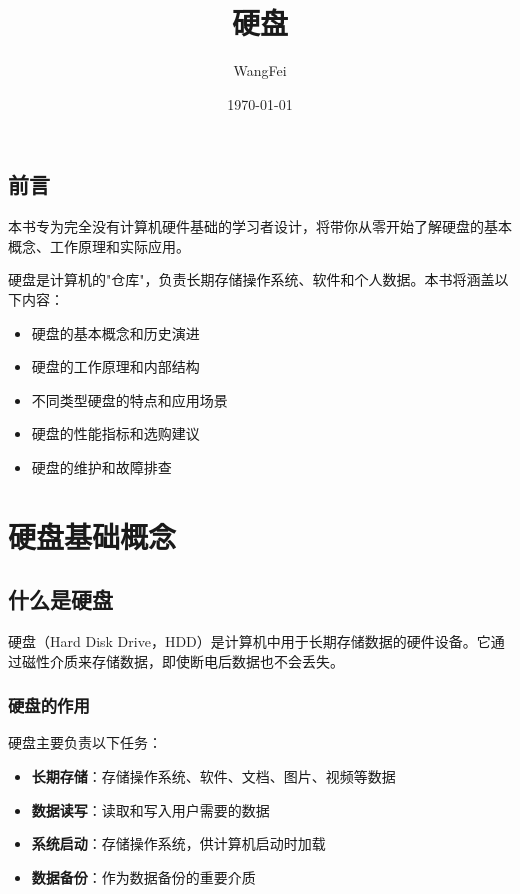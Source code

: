 \documentclass[12pt,UTF8]{ctexbook}
\title{\heiti\zihao{0} 硬盘}
\author{WangFei}
\date{\today}
\begin{document}
\maketitle
\tableofcontents

\frontmatter
\chapter{前言}

本书专为完全没有计算机硬件基础的学习者设计，将带你从零开始了解硬盘的基本概念、工作原理和实际应用。

硬盘是计算机的"仓库"，负责长期存储操作系统、软件和个人数据。本书将涵盖以下内容：
\begin{itemize}
    \item 硬盘的基本概念和历史演进
    \item 硬盘的工作原理和内部结构
    \item 不同类型硬盘的特点和应用场景
    \item 硬盘的性能指标和选购建议
    \item 硬盘的维护和故障排查
\end{itemize}

\mainmatter

\part{硬盘基础概念}

\chapter{什么是硬盘}

硬盘（Hard Disk Drive，HDD）是计算机中用于长期存储数据的硬件设备。它通过磁性介质来存储数据，即使断电后数据也不会丢失。

\section{硬盘的作用}

硬盘主要负责以下任务：

\begin{itemize}[leftmargin=2em]
    \item \textbf{长期存储}：存储操作系统、软件、文档、图片、视频等数据
    \item \textbf{数据读写}：读取和写入用户需要的数据
    \item \textbf{系统启动}：存储操作系统，供计算机启动时加载
    \item \textbf{数据备份}：作为数据备份的重要介质
\end{itemize}
\end{document}

